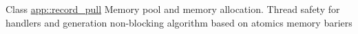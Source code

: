 
\begin{DoxyRefList}
\item[Class \mbox{\hyperlink{classapp_1_1record__pull}{app::record\+\_\+pull}} ]\label{todo__todo000001}%
%
Memory pool and memory allocation. Thread safety for handlers and generation non-\/blocking algorithm based on atomics memory bariers 
\end{DoxyRefList}
